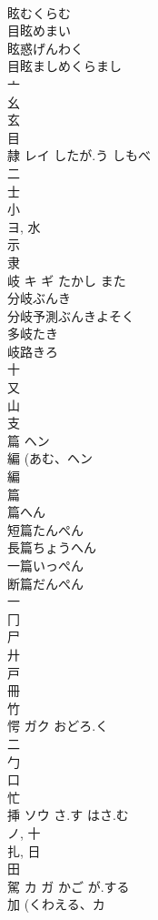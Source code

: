 \documentclass[8pt]{extreport}
\begin{document}
\begin{CJK}{UTF8}{min}
\\	眩むくらむ
\\	目眩めまい
\\	眩惑げんわく
\\	目眩ましめくらまし
\\	亠 
\\	幺 
\\	玄 
\\	目 
\\	隷	レイ	したが.う しもべ	
\\	二 
\\	士 
\\	小 
\\	ヨ, 水 
\\	示 
\\	隶 
\\	岐	キ ギ	たかし また	
\\	分岐ぶんき
\\	分岐予測ぶんきよそく
\\	多岐たき
\\	岐路きろ
\\	十 
\\	又 
\\	山 
\\	支 
\\	篇	ヘン		
\\	編 (あむ、ヘン 
\\	編 
\\	篇 
\\	篇へん 
\\	短篇たんぺん 
\\	長篇ちょうへん 
\\	一篇いっぺん 
\\	断篇だんぺん 
\\	一 
\\	冂 
\\	尸 
\\	廾 
\\	戸 
\\	冊 
\\	竹 
\\	愕	ガク	おどろ.く	
\\	二 
\\	勹 
\\	口 
\\	忙 
\\	挿	ソウ	さ.す はさ.む	
\\	ノ, 十 
\\	扎, 日 
\\	田 
\\	駕	カ ガ	かご が.する	
\\	加 (くわえる、カ 

\end{CJK}
\end{document}
